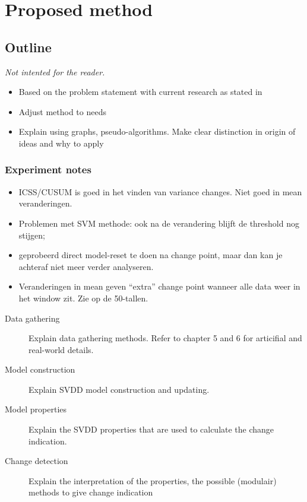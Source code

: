 
\chapter{Proposed method}

\label{Chapter4} %


\section{Outline}
\emph{Not intented for the reader.}
\begin{itemize}
  \item Based on the problem statement with current research as stated in 
  \item Adjust method to needs
  \item Explain using graphs, pseudo-algorithms. Make clear distinction in origin of ideas and why to apply
\end{itemize}


\subsection{Experiment notes}
\begin{itemize}
  \item ICSS/CUSUM is goed in het vinden van variance changes. Niet goed in mean veranderingen.
  \item Problemen met SVM methode: ook na de verandering blijft de threshold nog stijgen;
  \item geprobeerd direct model-reset te doen na change point, maar dan kan je achteraf niet meer verder analyseren.
  \item Veranderingen in mean geven ``extra'' change point wanneer alle data weer in het window zit. Zie  op de 50-tallen.
\end{itemize}


\begin{description}
  \item[Data gathering] Explain data gathering methods. Refer to chapter 5 and 6 for articifial and real-world details.
  \item[Model construction] Explain SVDD model construction and updating.
  \item[Model properties] Explain the SVDD properties that are used to calculate the change indication.
  \item[Change detection] Explain the interpretation of the properties, the possible (modulair) methods to give change indication
\end{description}


